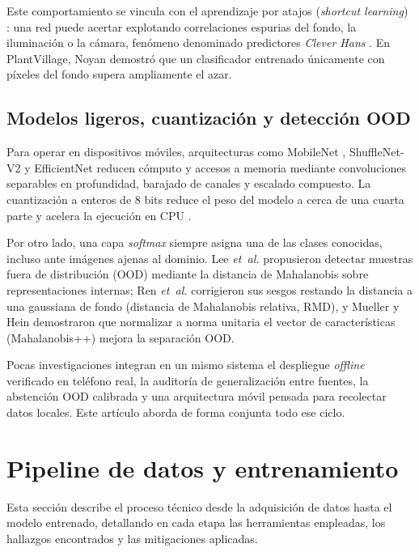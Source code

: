 \documentclass[conference,letterpaper]{IEEEtran}
\begin{document}
Este comportamiento se vincula con el aprendizaje por atajos (\textit{shortcut learning}) \cite{geirhos2020}: una red puede acertar explotando correlaciones espurias del fondo, la iluminación o la cámara, fenómeno denominado predictores \textit{Clever Hans} \cite{lapuschkin2019}. En PlantVillage, Noyan \cite{noyan2022} demostró que un clasificador entrenado únicamente con píxeles del fondo supera ampliamente el azar.

\subsection{Modelos ligeros, cuantización y detección OOD}
Para operar en dispositivos móviles, arquitecturas como MobileNet \cite{howard2017,sandler2018}, ShuffleNet-V2 \cite{ma2018} y EfficientNet \cite{tan2019} reducen cómputo y accesos a memoria mediante convoluciones separables en profundidad, barajado de canales y escalado compuesto. La cuantización a enteros de 8 bits reduce el peso del modelo a cerca de una cuarta parte y acelera la ejecución en CPU \cite{jacob2018}.

Por otro lado, una capa \textit{softmax} siempre asigna una de las clases conocidas, incluso ante imágenes ajenas al dominio. Lee \textit{et~al.} \cite{lee2018} propusieron detectar muestras fuera de distribución (OOD) mediante la distancia de Mahalanobis sobre representaciones internas; Ren \textit{et~al.} \cite{ren2021} corrigieron sus sesgos restando la distancia a una gaussiana de fondo (distancia de Mahalanobis relativa, RMD), y Mueller y Hein \cite{mueller2025} demostraron que normalizar a norma unitaria el vector de características (Mahalanobis++) mejora la separación OOD.

Pocas investigaciones integran en un mismo sistema el despliegue \textit{offline} verificado en teléfono real, la auditoría de generalización entre fuentes, la abstención OOD calibrada y una arquitectura móvil pensada para recolectar datos locales. Este artículo aborda de forma conjunta todo ese ciclo.

\section{Pipeline de datos y entrenamiento}\label{sec:pipeline}

Esta sección describe el proceso técnico desde la adquisición de datos hasta el modelo entrenado, detallando en cada etapa las herramientas empleadas, los hallazgos encontrados y las mitigaciones aplicadas.
\end{document}
